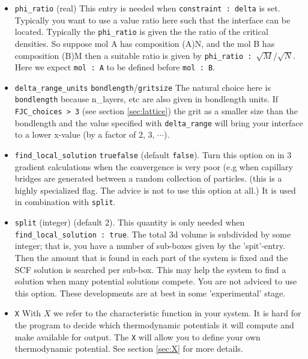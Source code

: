 \documentclass{article}
\begin{document}
\begin{itemize}
\item {\tt phi\_ratio} (real) This entry is needed when {\tt constraint : delta} is set. Typically you want to use a value ratio here such that the interface can be located. Typically the {\tt phi\_ratio} is given  the the ratio of the critical densities. So suppose mol A has composition (A)N, and the mol B has composition (B)M then a suitable ratio is given by {\tt phi\_ratio : $\sqrt{M}/\sqrt{N}$}. Here we expect {\tt mol : A} to be defined before {\tt mol : B}. 

\item {\tt delta\_range\_units}  {\tt bondlength}/{\tt gritsize} The natural choice here is {\tt bondlength} because {n\_layers}, etc are also given in bondlength units. If {\tt FJC\_choices > 3} (see section \ref{sec:lattice}) the grit as a smaller size than the bondlength and the value specified with {\tt delta\_range} will bring your interface to a lower x-value (by a factor of 2, 3, $\cdots$).

\item {\tt find\_local\_solution} {\tt true}{\tt false} (default {\tt false}). Turn this option on in 3 gradient calculations when the convergence is very poor (e.g when capillary bridges are generated between a random collection of particles. (this is a highly specialized flag. The advice is not to use this option at all.) It is used in combination with {\tt split}.

\item {\tt split} (integer) (default 2). This quantity is only needed when {\tt find\_local\_solution : true}. The total 3d volume is subdivided by some integer; that is, you have a number of sub-boxes given by the 'spit'-entry. Then the amount that is found in each part of the system is fixed and the SCF solution is searched per sub-box. This may help the system to find a solution when many potential solutions compete. You are not adviced to use this option. These developments are at best in some 'experimental' stage. 

\item {\tt X} With $X$ we refer to the characteristic function in your system. It is hard for the program to decide which thermodynamic potentials it will compute and make available for output. The  {\tt X} will allow you to define your own thermodynamic potential. See section \ref{sec:X} for more details.

\end{itemize}
\end{document}
